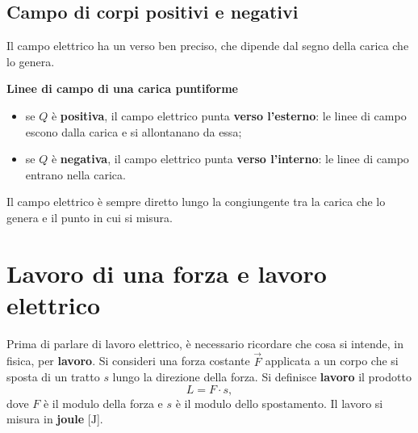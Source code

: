 \subsection{Campo di corpi positivi e negativi}

Il campo elettrico ha un verso ben preciso, che dipende dal segno della carica che lo genera.

\begin{concetto}
\textbf{Linee di campo di una carica puntiforme}
\begin{itemize}[leftmargin=1cm]
  \item se \(Q\) è \textbf{positiva}, il campo elettrico punta \textbf{verso l'esterno}: le linee di campo escono dalla carica e si allontanano da essa;
  \item se \(Q\) è \textbf{negativa}, il campo elettrico punta \textbf{verso l'interno}: le linee di campo entrano nella carica.
\end{itemize}
Il campo elettrico è sempre diretto lungo la congiungente tra la carica che lo genera e il punto in cui si misura.
\end{concetto}

\begin{figure}[htbp]
\centering
{}
\end{figure}

\section{Lavoro di una forza e lavoro elettrico}


Prima di parlare di lavoro elettrico, è necessario ricordare che cosa si intende, in fisica, per \textbf{lavoro}. Si consideri una forza costante \(\vec{F}\) applicata a un corpo che si sposta di un tratto \(s\) lungo la direzione della forza. Si definisce \textbf{lavoro} il prodotto
\[
L = F \cdot s,
\]
dove \(F\) è il modulo della forza e \(s\) è il modulo dello spostamento. Il lavoro si misura in \textbf{joule} [\(\text{J}\)].

